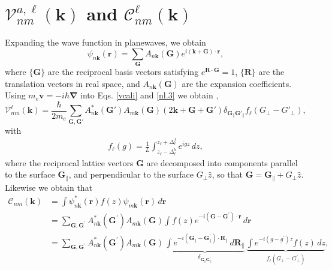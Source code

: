 \section[Matrix Elements for the Layered Velocity Operator and Cut Function.]
{\texorpdfstring{$\mathcal{V}^{a,\ell}_{nm}(\mathbf{k})$ and
$\mathcal{C}^{\ell}_{nm}(\mathbf{k})$}{Vnm and Cnm}}
\label{app:calpcalc}

Expanding the wave function in planewaves, we obtain
\begin{equation}\label{eni.1}
\psi_{n\mathbf{k}}(\mathbf{r})
= \sum_{\mathbf{G}}
A_{n\mathbf{k}}(\mathbf{G})e^{i(\mathbf{k}+\mathbf{G})\cdot\mathbf{r}},
\end{equation}
where $\{\mathbf{G}\}$ are the reciprocal basis vectors satisfying
$e^{\mathbf{R}\cdot\mathbf{G}} = 1$, $\{\mathbf{R}\}$ are the translation
vectors in real space, and $A_{n\mathbf{k}}(\mathbf{G})$ are the expansion
coefficients. Using $m_{e}\mathbf{v} = -i\hbar\boldsymbol{\nabla}$ into Eqs.
\eqref{vcali} and \eqref{nl.3} we obtain \cite{mendozaPRB06},
\begin{equation}\label{eni.2}
\boldsymbol{\mathcal{V}}^{\ell}_{nm}(\mathbf{k})=
\frac{\hbar}{2m_{e}}\sum_{\mathbf{G},\mathbf{G}'}
A^*_{n\mathbf{k}}(\mathbf{G}')A_{m\mathbf{k}}(\mathbf{G})
(2\mathbf{k}+\mathbf{G}+\mathbf{G}')
\delta_{\mathbf{G}_\parallel \mathbf{G}'_\parallel}f_{\ell}(G_\perp-G'_\perp),
\end{equation}   
with
\begin{align}\label{eni.3}
f_{\ell}(g) = \frac{1}{L}
\int_{z_{\ell}-\Delta^{b}_{\ell}}^{z_{\ell}+\Delta^{f}_{\ell}}
e^{igz}\,dz,
\end{align}
where the reciprocal lattice vectors $\mathbf{G}$ are decomposed into components
parallel to the surface $\mathbf{G}_{\parallel}$, and perpendicular to the
surface $G_{\perp}\hat{z}$, so that $\mathbf{G} = \mathbf{G}_{\parallel} +
G_{\perp}\hat{z}$. Likewise we obtain that
\begin{align*}
\mathcal{C}_{nm}(\mathbf{k})
&=  \int\psi^{*}_{n\mathbf{k}}(\mathbf{r})f(z)
    \psi_{m\mathbf{k}}(\mathbf{r})\,d\mathbf{r}\\
&=  \sum_{\mathbf{G},\mathbf{G^{\prime}}}
    A^{*}_{n\mathbf{k}}(\mathbf{G^{\prime}})
    A_{m\mathbf{k}}(\mathbf{G})
   \int f(z)e^{-i(\mathbf{G}-\mathbf{G^{\prime}})\cdot\mathbf{r}}\,d\mathbf{r}\\
&=  \sum_{\mathbf{G},\mathbf{G^{\prime}}}
    A^{*}_{n\mathbf{k}}(\mathbf{G^{\prime}})
    A_{m\mathbf{k}}(\mathbf{G})\,
    \underbrace{
    \int e^{-i(\mathbf{G}_{\parallel}-\mathbf{G}^{\prime}_{\parallel})
    \cdot\mathbf{R}_{\parallel}}\,d\mathbf{R}_{\parallel}
    }_{\delta_{\mathbf{G}_{\parallel}\mathbf{G}^{\prime}_{\parallel}}}
    \,\underbrace{
    \int e^{-i(g-g^{\prime})z}f(z)\,dz
    }_{f_{\ell}(G_{\perp} - G^{\prime}_{\perp})},
\end{align*}
